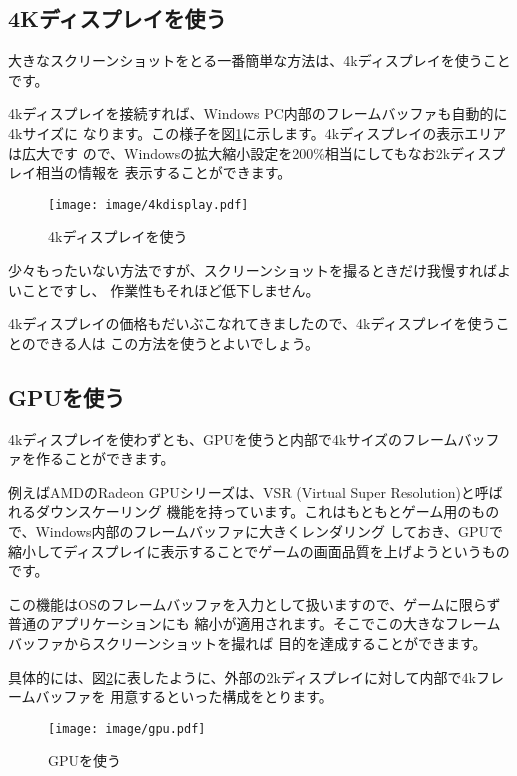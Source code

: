 \subsection{4Kディスプレイを使う}
大きなスクリーンショットをとる一番簡単な方法は、4kディスプレイを使うことです。

4kディスプレイを接続すれば、Windows PC内部のフレームバッファも自動的に4kサイズに
なります。この様子を図\ref{fig:4k-display}に示します。4kディスプレイの表示エリアは広大です
ので、Windowsの拡大縮小設定を200\%相当にしてもなお2kディスプレイ相当の情報を
表示することができます。

\begin{figure}[btp]
  \begin{center}
    \texttt{[image: image/4kdisplay.pdf]}
    \caption{4kディスプレイを使う} \label{fig:4k-display}
  \end{center}
\end{figure}

少々もったいない方法ですが、スクリーンショットを撮るときだけ我慢すればよいことですし、
作業性もそれほど低下しません。

4kディスプレイの価格もだいぶこなれてきましたので、4kディスプレイを使うことのできる人は
この方法を使うとよいでしょう。

\subsection{GPUを使う}
4kディスプレイを使わずとも、GPUを使うと内部で4kサイズのフレームバッファを作ることができます。

例えばAMDのRadeon GPUシリーズは、VSR (Virtual Super Resolution)と呼ばれるダウンスケーリング
機能を持っています。これはもともとゲーム用のもので、Windows内部のフレームバッファに大きくレンダリング
しておき、GPUで縮小してディスプレイに表示することでゲームの画面品質を上げようというものです。

この機能はOSのフレームバッファを入力として扱いますので、ゲームに限らず普通のアプリケーションにも
縮小が適用されます。そこでこの大きなフレームバッファからスクリーンショットを撮れば
目的を達成することができます。

具体的には、図\ref{fig:gpu}に表したように、外部の2kディスプレイに対して内部で4kフレームバッファを
用意するといった構成をとります。

\begin{figure}[btp]
  \begin{center}
    \texttt{[image: image/gpu.pdf]}
    \caption{GPUを使う} \label{fig:gpu}
  \end{center}
\end{figure}

